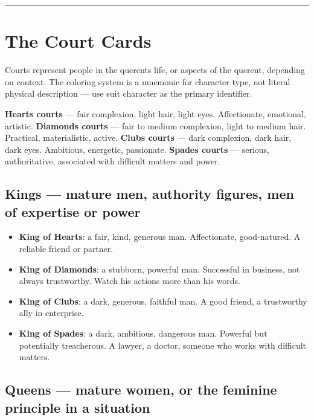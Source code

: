 \begin{center}\rule{0.5\linewidth}{0.5pt}\end{center}

\section{The Court Cards}\label{the-court-cards}

Courts represent people in the querent\textquotesingle s life, or aspects of the querent, depending on context. The coloring system is a mnemonic for character type, not literal physical description --- use suit character as the primary identifier.

\textbf{Hearts courts} --- fair complexion, light hair, light eyes. Affectionate, emotional, artistic. \textbf{Diamonds courts} --- fair to medium complexion, light to medium hair. Practical, materialistic, active. \textbf{Clubs courts} --- dark complexion, dark hair, dark eyes. Ambitious, energetic, passionate. \textbf{Spades courts} --- serious, authoritative, associated with difficult matters and power.

\subsection{Kings --- mature men, authority figures, men of expertise or power}\label{kings--mature-men-authority-figures-men-of-expertise-or-power}

\begin{itemize}
\tightlist
\item
  \textbf{King of Hearts}: a fair, kind, generous man. Affectionate, good-natured. A reliable friend or partner.
\item
  \textbf{King of Diamonds}: a stubborn, powerful man. Successful in business, not always trustworthy. Watch his actions more than his words.
\item
  \textbf{King of Clubs}: a dark, generous, faithful man. A good friend, a trustworthy ally in enterprise.
\item
  \textbf{King of Spades}: a dark, ambitious, dangerous man. Powerful but potentially treacherous. A lawyer, a doctor, someone who works with difficult matters.
\end{itemize}

\subsection{Queens --- mature women, or the feminine principle in a situation}\label{queens--mature-women-or-the-feminine-principle-in-a-situation}

